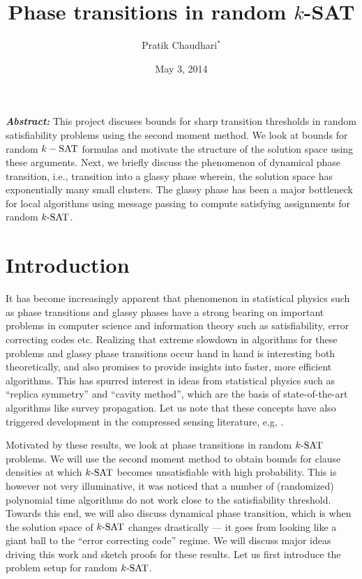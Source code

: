 \documentclass[letterpaper, 10pt, twocolumn, reqno]{amsart}
\title{Phase transitions in random $k$-SAT}
\author{Pratik Chaudhari$^*$}
\date{May 3, 2014}
\begin{document}
\maketitle
{\small
\textbf{\emph{Abstract:}}
This project discuses bounds for sharp transition thresholds in random satisfiability problems using the second moment method. We look at bounds for random $k-\textrm{SAT}$ formulas and motivate the structure of the solution space using these arguments. Next, we briefly discuss the phenomenon of dynamical phase transition, i.e., transition into a glassy phase wherein, the solution space has exponentially many small clusters. The glassy phase has been a major bottleneck for local algorithms using message passing to compute satisfying assignments for random $k\textrm{-SAT}$.
}

\section{Introduction}
\label{sec:intro}
It has become increasingly apparent that phenomenon in statistical physics such as phase transitions and glassy phases have a strong bearing on important problems in computer science and information theory such as satisfiability, error correcting codes etc. Realizing that extreme slowdown in algorithms for these problems and glassy phase transitions occur hand in hand is interesting both theoretically, and also promises to provide insights into faster, more efficient algorithms. This has spurred interest in ideas from statistical physics such as ``replica symmetry'' and ``cavity method'', which are the basis of state-of-the-art algorithms like survey propagation. Let us note that these concepts have also triggered development in the compressed sensing literature, e.g, \cite{krzakala2012statistical}.



Motivated by these results, we look at phase transitions in random $k\textrm{-SAT}$ problems. We will use the second moment method to obtain bounds for clause
densities at which $k\textrm{-SAT}$ becomes unsatisfiable with high probability. This is however not very illuminative, it was noticed that a number of (randomized)
polynomial time algorithms do not work close to the satisfiability threshold. Towards this end, we will also discuss dynamical phase transition, which is
when the solution space of $k\textrm{-SAT}$ changes drastically --- it goes from looking like a giant ball to the ``error correcting code'' regime. We will discuss major ideas driving this work and sketch proofs for these results. Let us first introduce the problem setup for random $k\textrm{-SAT}$.
\end{document}
